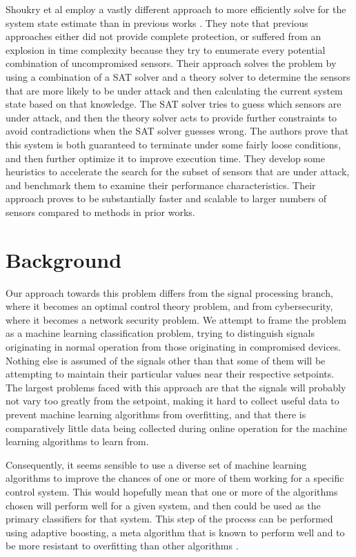 \documentclass[10pt,twocolumn]{IEEEtran}
\begin{document}
Shoukry et al employ a vastly different approach to more efficiently solve for the system state estimate than in previous works \cite{modulo}.
They note that previous approaches either did not provide complete protection, or suffered from an explosion in time complexity because they try to enumerate every potential combination of uncompromised sensors.
Their approach solves the problem by using a combination of a SAT solver and a theory solver to determine the sensors that are more likely to be under attack and then calculating the current system state based on that knowledge.
The SAT solver tries to guess which sensors are under attack, and then the theory solver acts to provide further constraints to avoid contradictions when the SAT solver guesses wrong.
The authors prove that this system is both guaranteed to terminate under some fairly loose conditions, and then further optimize it to improve execution time.
They develop some heuristics to accelerate the search for the subset of sensors that are under attack, and benchmark them to examine their performance characteristics.
Their approach proves to be substantially faster and scalable to larger numbers of sensors compared to methods in prior works.

\section{Background} \label{sec:bg}
Our approach towards this problem differs from the signal processing branch, where it becomes an optimal control theory problem, and from cybersecurity, where it becomes a network security problem.
We attempt to frame the problem as a machine learning classification problem, trying to distinguish signals originating in normal operation from those originating in compromised devices.
Nothing else is assumed of the signals other than that some of them will be attempting to maintain their particular values near their respective setpoints.
The largest problems faced with this approach are that the signals will probably not vary too greatly from the setpoint, making it hard to collect useful data to prevent machine learning algorithms from overfitting, and that there is comparatively little data being collected during online operation for the machine learning algorithms to learn from.

Consequently, it seems sensible to use a diverse set of machine learning algorithms to improve the chances of one or more of them working for a specific control system.
This would hopefully mean that one or more of the algorithms chosen will perform well for a given system, and then could be used as the primary classifiers for that system.
This step of the process can be performed using adaptive boosting, a meta algorithm that is known to perform well and to be more resistant to overfitting than other algorithms \cite{adaboost}.
\end{document}
